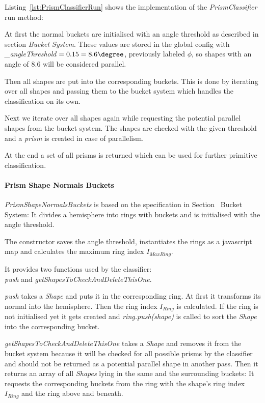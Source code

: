 \documentclass[../ClassicThesis.tex]{subfiles}
\begin{document}
Listing~\ref{lst:PrismClassifierRun} shows the implementation of the \emph{PrismClassifier} run method:

At first the normal buckets are initialised with an angle threshold as described in section \emph{Bucket System}. These values are stored in the global config with \emph{\_angleThreshold} $ = 0.15 = 8.6\degree $, previously labeled $\phi$, so shapes with an angle  of 8.6\textdegree \hspace{1pt} will be considered parallel.

Then all shapes are put into the corresponding buckets. This is done by iterating over all shapes and passing them to the bucket system which handles the classification on its own.

Next we iterate over all shapes again while requesting the potential parallel shapes from the bucket system. The shapes are checked with the given threshold and a \emph{prism} is created in case of parallelism.

At the end a set of all prisms is returned which can be used for further primitive classification.


\paragraph{Prism Shape Normals Buckets}

\emph{PrismShapeNormalsBuckets} is based on the specification in Section~ Bucket System: It divides a hemisphere into rings with buckets and is initialised with the angle threshold.

The constructor saves the angle threshold, instantiates the rings as a javascript map and calculates the maximum ring index $I_{MaxRing}$.

It provides two functions used by the classifier: \\
\emph{push} and \emph{getShapesToCheckAndDeleteThisOne}.

\emph{push} takes a \emph{Shape} and puts it in the corresponding ring. At first it transforms its normal into the hemisphere. Then the ring index $ I_{Ring} $ is calculated. If the ring is not initialised yet it gets created and \emph{ring.push(shape)} is called to sort the \emph{Shape} into the corresponding bucket.

\emph{getShapesToCheckAndDeleteThisOne} takes a \emph{Shape} and removes it from the bucket system because it will be checked for all possible prisms by the classifier and should not be returned as a potential parallel shape in another pass. Then it returns an array of all \emph{Shapes} lying in the same and the surrounding buckets: It requests the corresponding buckets from the ring with the shape's ring index $ I_{Ring} $ and the ring above and beneath.
\end{document}
